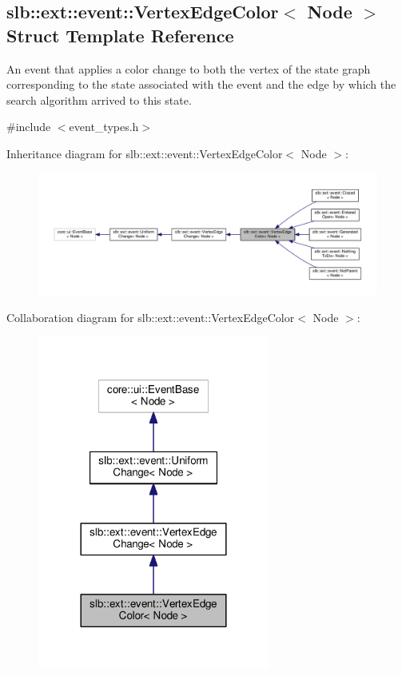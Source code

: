 \hypertarget{structslb_1_1ext_1_1event_1_1VertexEdgeColor}{}\subsection{slb\+:\+:ext\+:\+:event\+:\+:Vertex\+Edge\+Color$<$ Node $>$ Struct Template Reference}
\label{structslb_1_1ext_1_1event_1_1VertexEdgeColor}


An event that applies a color change to both the vertex of the state graph corresponding to the state associated with the event and the edge by which the search algorithm arrived to this state.  




{\ttfamily \#include $<$event\+\_\+types.\+h$>$}



Inheritance diagram for slb\+:\+:ext\+:\+:event\+:\+:Vertex\+Edge\+Color$<$ Node $>$\+:\nopagebreak
\begin{figure}[H]
\begin{center}
\leavevmode
\includegraphics[width=350pt]{structslb_1_1ext_1_1event_1_1VertexEdgeColor__inherit__graph}
\end{center}
\end{figure}


Collaboration diagram for slb\+:\+:ext\+:\+:event\+:\+:Vertex\+Edge\+Color$<$ Node $>$\+:\nopagebreak
\begin{figure}[H]
\begin{center}
\leavevmode
\includegraphics[width=216pt]{structslb_1_1ext_1_1event_1_1VertexEdgeColor__coll__graph}
\end{center}
\end{figure}

